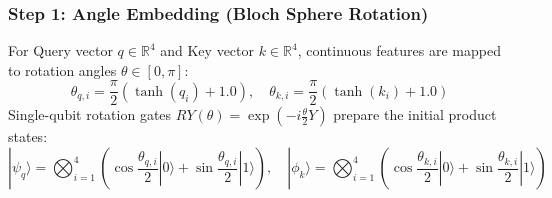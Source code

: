 \documentclass[11pt,a4paper]{article}
\begin{document}
\subsubsection{Step 1: Angle Embedding (Bloch Sphere Rotation)}
For Query vector $q \in \mathbb{R}^4$ and Key vector $k \in \mathbb{R}^4$, continuous features are mapped to rotation angles $\theta \in [0, \pi]$:
\begin{equation}
\theta_{q, i} = \frac{\pi}{2}\left(\tanh(q_i) + 1.0\right), \quad \theta_{k, i} = \frac{\pi}{2}\left(\tanh(k_i) + 1.0\right)
\end{equation}
Single-qubit rotation gates $RY(\theta) = \exp(-i \frac{\theta}{2} Y)$ prepare the initial product states:
\begin{equation}
|\psi_q\rangle = \bigotimes_{i=1}^4 \left( \cos\frac{\theta_{q, i}}{2}|0\rangle + \sin\frac{\theta_{q, i}}{2}|1\rangle \right), \quad
|\phi_k\rangle = \bigotimes_{i=1}^4 \left( \cos\frac{\theta_{k, i}}{2}|0\rangle + \sin\frac{\theta_{k, i}}{2}|1\rangle \right)
\end{equation}
\end{document}
